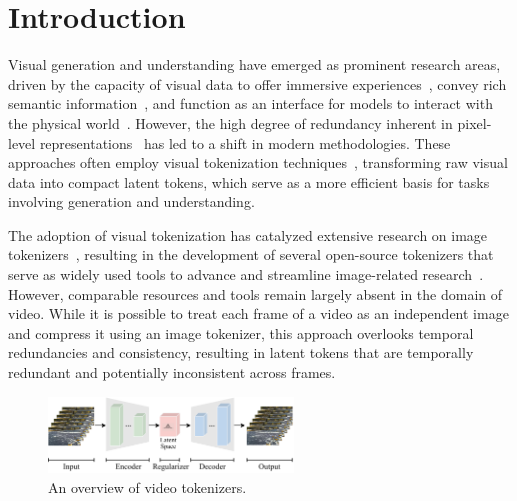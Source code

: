 \documentclass{article} %
\begin{document}
\section{Introduction}
\label{sec:intro}

Visual generation and understanding have emerged as prominent research areas, driven by the capacity of visual data to offer immersive experiences~\citep{ho2022video,singer2023make,ho2022imagen,yu2023magvit,kondratyuk2024videopoet,yang2024cogvideox,bai2024uniedit,zhu2024compositional}, convey rich semantic information~\citep{li2023videochat,zhang2024video,liu2024visual}, and function as an interface for models to interact with the physical world~\citep{pmlr-v235-yang24z,yang2024learning,zhang2024videoicl,chen2024igor}. However, the high degree of redundancy inherent in pixel-level representations~\citep{sullivan2012overview} has led to a shift in modern methodologies. These approaches often employ visual tokenization techniques~\citep{rombach2022high,sora,kondratyuk2024videopoet,wu2024janus,team2024chameleon}, transforming raw visual data into compact latent tokens, which serve as a more efficient basis for tasks involving generation and understanding.

The adoption of visual tokenization has catalyzed extensive research on image tokenizers~\citep{rombach2022high,zheng2022movq,patil2024amused}, resulting in the development of several open-source tokenizers that serve as widely used tools to advance and streamline image-related research~\citep{repolatent,repomuse,repomagvit2}. However, comparable resources and tools remain largely absent in the domain of video. While it is possible to treat each frame of a video as an independent image and compress it using an image tokenizer, this approach overlooks temporal redundancies and consistency, resulting in latent tokens that are temporally redundant and potentially inconsistent across frames.

\begin{figure}
  \begin{center}
    \includegraphics[width=0.58\textwidth]{imgs/overview.pdf}
  \end{center}
  \caption{An overview of video tokenizers.}
  \label{fig:overview}
\end{figure}
\end{document}
